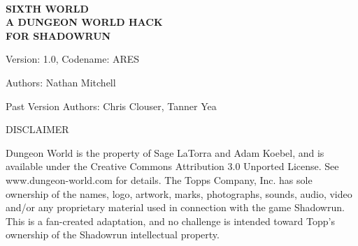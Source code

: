 \begin{titlepage}

\begin{center}



~\\[5cm]

{\fontsize{75pt}{1em}\selectfont\bfseries
  SIXTH WORLD}\\[.5cm]

{\orbitronfont\fontsize{22.5pt}{1em}\selectfont\bfseries
  A DUNGEON WORLD HACK}\\[0.5cm]

{\orbitronfont\fontsize{22.5pt}{1em}\selectfont\bfseries
  FOR SHADOWRUN}\\[0.5cm]



\vfill

Version: 1.0, Codename: ARES

Authors: Nathan Mitchell

Past Version Authors: Chris Clouser, Tanner Yea

\end{center}

DISCLAIMER

Dungeon World is the property of Sage LaTorra and Adam Koebel, and is available under the Creative Commons Attribution 3.0 Unported
License. See www.dungeon-world.com for details.
The Topps Company, Inc. has sole ownership of the names, logo, artwork, marks, photographs, sounds, audio, video and/or any proprietary
material used in connection with the game Shadowrun. This is a fan-created adaptation, and no challenge is intended toward Topp’s ownership of the Shadowrun intellectual property.





\end{titlepage}
